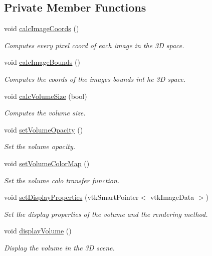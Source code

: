 \subsection*{Private Member Functions}
\begin{DoxyCompactItemize}
\item 
void \hyperlink{class_volume_reconstruction_widget_a8a4852fab62c5f8512f758cb3a106071}{calc\-Image\-Coords} ()
\begin{DoxyCompactList}\small\item\em Computes every pixel coord of each image in the 3\-D space. \end{DoxyCompactList}\item 
void \hyperlink{class_volume_reconstruction_widget_a6645ccc86f2b2b02e38835f191a96464}{calc\-Image\-Bounds} ()
\begin{DoxyCompactList}\small\item\em Computes the coords of the images bounds int he 3\-D space. \end{DoxyCompactList}\item 
void \hyperlink{class_volume_reconstruction_widget_aacf14912ac38b5633f01bb3c742f54f4}{calc\-Volume\-Size} (bool)
\begin{DoxyCompactList}\small\item\em Computes the volume size. \end{DoxyCompactList}\item 
void \hyperlink{class_volume_reconstruction_widget_a8802c2c6061cae11b7e3540ed78e6d7a}{set\-Volume\-Opacity} ()
\begin{DoxyCompactList}\small\item\em Set the volume opacity. \end{DoxyCompactList}\item 
void \hyperlink{class_volume_reconstruction_widget_a0e24f75040e46128747c83e670cc242a}{set\-Volume\-Color\-Map} ()
\begin{DoxyCompactList}\small\item\em Set the volume colo transfer function. \end{DoxyCompactList}\item 
void \hyperlink{class_volume_reconstruction_widget_a318c42b0fc54dda95cf2a71346f994ff}{set\-Display\-Properties} (vtk\-Smart\-Pointer$<$ vtk\-Image\-Data $>$)
\begin{DoxyCompactList}\small\item\em Set the display properties of the volume and the rendering method. \end{DoxyCompactList}\item 
void \hyperlink{class_volume_reconstruction_widget_a09883a3dbf07b5edf1dae1ce20bbbc29}{display\-Volume} ()
\begin{DoxyCompactList}\small\item\em Display the volume in the 3\-D scene. \end{DoxyCompactList}\end{DoxyCompactItemize}

